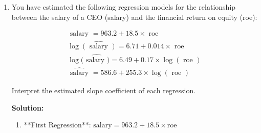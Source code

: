 \documentclass[12pt]{article}
\begin{document}
\begin{enumerate}
{\begin{enumerate}
Interpretation:
\begin{itemize}
    \item The slope \( \hat{\beta}_1 = -0.25 \) indicates that for each unit increase in \( x \), \( y \) decreases by \( 0.25 \) units.
    \item The intercept \( \hat{\beta}_0 = 4.75 \) suggests that when \( x = 0 \), the predicted value of \( y \) is \( 4.75 \). However, the interpretation of the intercept depends on the context of the variables.
\end{itemize}

\item Given:
\[
\sum_{i=1}^n \left( y_i - \bar{y} \right)^2 = 0.8, \quad \sum_{i=1}^n \left( \hat{y}_i - \bar{y} \right)^2 = 0.5, \quad \sum_{i=1}^n \left( y_i - \hat{y}_i \right)^2 = 0.3.
\]

The \( R^2 \) is calculated as:
\[
R^2 = \frac{\sum_{i=1}^n \left( \hat{y}_i - \bar{y} \right)^2}{\sum_{i=1}^n \left( y_i - \bar{y} \right)^2} = \frac{0.5}{0.8} = 0.625.
\]

Interpretation:
An \( R^2 \) value of 0.625 indicates that approximately 62.5\% of the variability in \( y \) (dependent variable) is explained by \( x \) (independent variable) in the model. This suggests a moderately strong relationship between the variables.



\end{enumerate}
}


\item You have estimated the following regression models for the relationship between the salary of a CEO (salary) and the financial return on equity (roe):

$$
\begin{gathered}
\text { salary } = 963.2 + 18.5 \times \text { roe } \\
\log \widehat{(\text { salary })} = 6.71 + 0.014 \times \text { roe } \\
\log (\widehat{\text { salary })} = 6.49 + 0.17 \times \log (\text { roe }) \\
\widehat{\text { salary }} = 586.6 + 255.3 \times \log (\text { roe })
\end{gathered}
$$

Interpret the estimated slope coefficient of each regression.

{\color{blue}
\noindent \textbf{Solution:}

\begin{enumerate}
    \item **First Regression**: \( \text{salary} = 963.2 + 18.5 \times \text{roe} \)


\end{enumerate}}
\end{enumerate}
\end{document}
